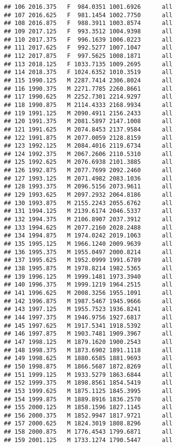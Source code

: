 \documentclass[]{article}
\begin{document}
\begin{verbatim}
## 106 2016.375   F  984.0351 1001.6926      all
## 107 2016.625   F  981.1454 1002.7750      all
## 108 2016.875   F  988.3911 1003.8574      all
## 109 2017.125   F  993.3512 1004.9398      all
## 110 2017.375   F  996.1639 1006.0223      all
## 111 2017.625   F  992.5277 1007.1047      all
## 112 2017.875   F  997.5625 1008.1871      all
## 113 2018.125   F 1033.7135 1009.2695      all
## 114 2018.375   F 1024.6352 1010.3519      all
## 115 1990.125   M 2287.7414 2306.8024      all
## 116 1990.375   M 2271.7785 2260.8661      all
## 117 1990.625   M 2252.7301 2214.9297      all
## 118 1990.875   M 2114.4333 2168.9934      all
## 119 1991.125   M 2090.4911 2156.2433      all
## 120 1991.375   M 2081.5897 2147.1008      all
## 121 1991.625   M 2074.8453 2137.9584      all
## 122 1991.875   M 2077.0059 2128.8159      all
## 123 1992.125   M 2084.4016 2119.6734      all
## 124 1992.375   M 2067.2606 2110.5310      all
## 125 1992.625   M 2076.6938 2101.3885      all
## 126 1992.875   M 2077.7699 2092.2460      all
## 127 1993.125   M 2071.4982 2083.1036      all
## 128 1993.375   M 2096.5156 2073.9611      all
## 129 1993.625   M 2097.2932 2064.8186      all
## 130 1993.875   M 2155.2243 2055.6762      all
## 131 1994.125   M 2139.6174 2046.5337      all
## 132 1994.375   M 2106.8907 2037.3912      all
## 133 1994.625   M 2077.2160 2028.2488      all
## 134 1994.875   M 1974.0242 2019.1063      all
## 135 1995.125   M 1966.1240 2009.9639      all
## 136 1995.375   M 1955.0497 2000.8214      all
## 137 1995.625   M 1952.0999 1991.6789      all
## 138 1995.875   M 1978.8214 1982.5365      all
## 139 1996.125   M 1999.1481 1973.3940      all
## 140 1996.375   M 1999.1219 1964.2515      all
## 141 1996.625   M 2008.3256 1955.1091      all
## 142 1996.875   M 1987.5467 1945.9666      all
## 143 1997.125   M 1955.7523 1936.8241      all
## 144 1997.375   M 1946.9756 1927.6817      all
## 145 1997.625   M 1917.5341 1918.5392      all
## 146 1997.875   M 1903.7481 1909.3967      all
## 147 1998.125   M 1879.1620 1900.2543      all
## 148 1998.375   M 1873.6902 1891.1118      all
## 149 1998.625   M 1880.6585 1881.9693      all
## 150 1998.875   M 1866.5687 1872.8269      all
## 151 1999.125   M 1933.5279 1863.6844      all
## 152 1999.375   M 1898.8561 1854.5419      all
## 153 1999.625   M 1875.1125 1845.3995      all
## 154 1999.875   M 1889.8916 1836.2570      all
## 155 2000.125   M 1858.1596 1827.1145      all
## 156 2000.375   M 1852.9947 1817.9721      all
## 157 2000.625   M 1824.3019 1808.8296      all
## 158 2000.875   M 1776.4543 1799.6871      all
## 159 2001.125   M 1733.1274 1790.5447      all

\end{verbatim}
\end{document}
